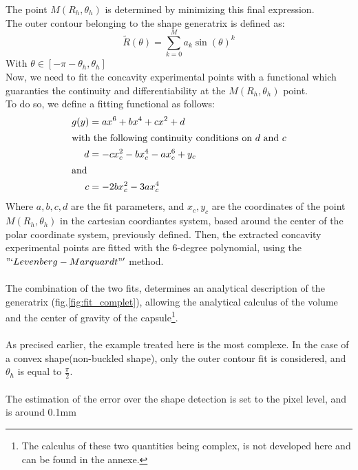 The point $M(R_{h},\theta_h)$ is determined by minimizing this final expression.\\
The outer contour belonging to the shape generatrix is defined as:
\begin{equation*}
	\tilde{R}(\theta) = \sum\limits_{k=0}^M a_k \sin(\theta)^k
\end{equation*}
With $\theta \in[-\pi-\theta_h,\theta_h]$\\
Now, we need to fit the concavity experimental points with a functional which guaranties the continuity and differentiability at the $M(R_{h},\theta_h)$ point.\\
To do so, we define a fitting functional as follows:
\begin{align*}
g(y) &= a x^6+b x^4+ c x^2+ d\\
\intertext{with the following continuity conditions on $d$ and $c$}
d &= -c x_{c}^2 - b x_{c}^4 -ax_{c}^6+ y_c\\
\intertext{and}
c &= -2 b x_{c}^2-3 a x_{c}^4
\end{align*}
Where $a,b,c,d$ are the fit parameters, and $x_c,y_c$ are the coordinates of the point $M(R_{h},\theta_h)$ in the cartesian coordiantes system, based around the center of the polar coordinate system, previously defined. Then, the extracted concavity experimental points are fitted with the 6-degree polynomial, using the $"`Levenberg-Marquardt"'$ method. \\
\paragraph{}
The combination of the two fits, determines an analytical description of the generatrix (fig.\ref{fig:fit_complet}), allowing the analytical calculus of the volume and the center of gravity of the capsule\footnote{The calculus of these two quantities being complex, is not developed here and can be found in the annexe.}. 
\paragraph{}
As precised earlier, the example treated here is the most complexe. In the case of a convex shape(non-buckled shape), only the outer contour fit is considered, and $\theta_h$ is equal to $\frac{\pi}{2}$.
\paragraph{}
The estimation of the error over the shape detection is set to the pixel level, and is around 0.1mm

